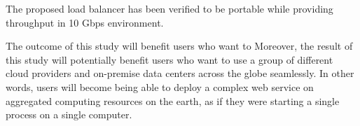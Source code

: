 The proposed load balancer has been verified to be portable while providing   throughput in 10 Gbps environment.

The outcome of this study will benefit users who want to 
Moreover, the result of this study will potentially benefit users who want to use a group of different cloud providers and on-premise data centers across the globe seamlessly.
In other words, users will become being able to deploy a complex web service on aggregated computing resources on the earth, as if they were starting a single process on a single computer.


